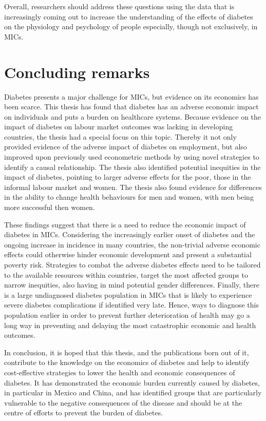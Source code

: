 Overall, researchers should address these questions using the data that is increasingly coming out to increase the understanding of the effects of diabetes on the physiology and psychology of people especially, though not exclusively, in \acp{MIC}.


\section{Concluding remarks}

Diabetes presents a major challenge for \acp{MIC}, but evidence on its economics has been scarce. This thesis has found that diabetes has an adverse economic impact on individuals and puts a burden on healthcare systems. Because evidence on the impact of diabetes on labour market outcomes was lacking in developing countries, the thesis had a special focus on this topic. Thereby it not only provided evidence of the adverse impact of diabetes on employment, but also improved upon previously used econometric methods by using novel strategies to identify a causal relationship. The thesis also identified potential inequities in the impact of diabetes, pointing to larger adverse effects for the poor, those in the informal labour market and women. The thesis also found evidence for differences in the ability to change health behaviours for men and women, with men being more successful then women. 

These findings suggest that there is a need to reduce the economic impact of diabetes in \acp{MIC}. Considering the increasingly earlier onset of diabetes and the ongoing increase in incidence in many countries, the non-trivial adverse economic effects could otherwise hinder economic development and present a substantial poverty risk. Strategies to combat the adverse diabetes effects need to be tailored to the available resources within countries, target the most affected groups to narrow inequities, also having in mind potential gender differences. Finally, there is a large undiagnosed diabetes population in \acp{MIC} that is likely to experience severe diabetes complications if identified very late. Hence, ways to diagnose this population earlier in order to prevent further deterioration of health may go a long way in preventing and delaying the most catastrophic economic and health outcomes.

In conclusion, it is hoped that this thesis, and the publications born out of it, contribute to the knowledge on the economics of diabetes and help to identify cost-effective strategies to lower the health and economic consequences of diabetes. It has demonstrated the economic burden currently caused by diabetes, in particular in Mexico and China, and has identified groups that are particularly vulnerable to the negative consequences of the disease and should be at the centre of efforts to prevent the burden of diabetes.